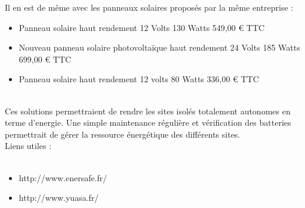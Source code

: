 Il en est de même avec les panneaux solaires proposés par la même entreprise :
\begin{itemize}
	\item Panneau solaire haut rendement 12 Volts 130 Watts 549,00 € TTC
	\item Nouveau panneau solaire photovoltaïque haut rendement 24 Volts 185 Watts 699,00 € TTC
	\item Panneau solaire haut rendement 12 volts 80 Watts 336,00 € TTC
\end{itemize}
~\\
Ces solutions permettraient de rendre les sites isolés totalement autonomes en terme d'energie. Une simple maintenance régulière et vérification des batteries permettrait de gérer la ressource énergétique des différents sites.\\


Liens utiles : \\~
\begin {itemize}
	\item http://www.enersafe.fr/
	\item http://www.yuasa.fr/
\end {itemize}
